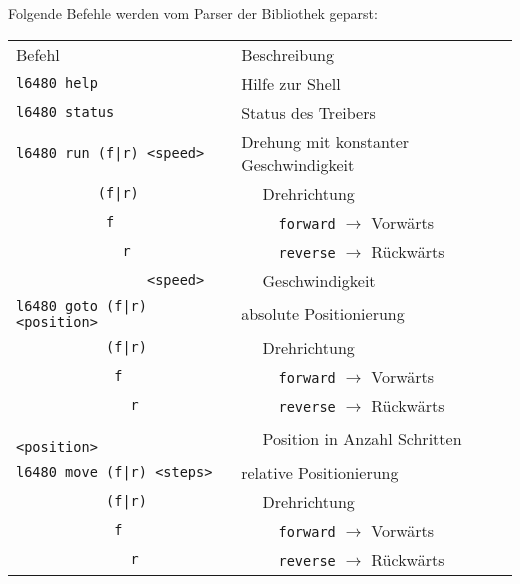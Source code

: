    \clearpage
    \noindent
    Folgende Befehle werden vom Parser der Bibliothek geparst: 
    \begin{table}[h!]
        \centering
        \begin{tabular}{p{}p{}}
            \rowcolor{gray}  Befehl                              & Beschreibung \\
            \rowcolor{white} \verb?l6480 help                  ? & Hilfe zur Shell \\
            \rowcolor{lgray} \verb?l6480 status                ? & Status des Treibers \\
            \rowcolor{white} \verb?l6480 run (f|r) <speed>     ? & Drehung mit konstanter Geschwindigkeit \\
            \rowcolor{white} \verb?          (f|r)             ? & $\quad$ Drehrichtung \\
            \rowcolor{white} \verb?           f                ? & $\quad\quad$ \verb?forward? $\to$ Vorwärts \\
            \rowcolor{white} \verb?             r              ? & $\quad\quad$ \verb?reverse? $\to$ Rückwärts \\
            \rowcolor{white} \verb?                <speed>     ? & $\quad$ Geschwindigkeit \\
            \rowcolor{lgray} \verb?l6480 goto (f|r) <position> ?  & absolute Positionierung  \\
            \rowcolor{lgray} \verb?           (f|r)            ?  & $\quad$ Drehrichtung  \\
            \rowcolor{lgray} \verb?            f               ?      & $\quad\quad$ \verb?forward? $\to$ Vorwärts \\
            \rowcolor{lgray} \verb?              r             ?      & $\quad\quad$ \verb?reverse? $\to$ Rückwärts \\
            \rowcolor{lgray} \verb?                 <position> ? & $\quad$ Position in Anzahl Schritten  \\
            \rowcolor{white} \verb?l6480 move (f|r) <steps>    ? & relative Positionierung \\
            \rowcolor{white} \verb?           (f|r)            ? & $\quad$ Drehrichtung \\
            \rowcolor{white} \verb?            f               ?      & $\quad\quad$ \verb?forward? $\to$ Vorwärts \\
            \rowcolor{white} \verb?              r             ?      & $\quad\quad$ \verb?reverse? $\to$ Rückwärts \\

\end{tabular}
\end{table}
